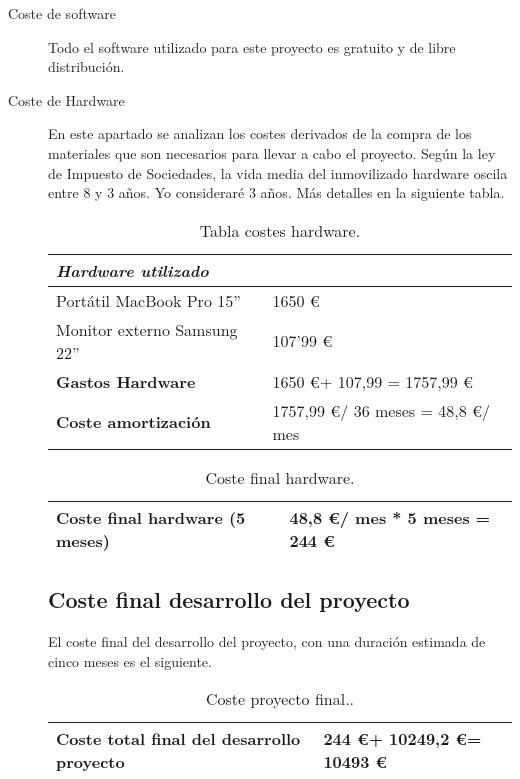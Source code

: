 \begin{description}
	\item[Coste de software] Todo el software utilizado para este proyecto es gratuito y de libre distribución. 
	
	\item[Coste de Hardware] En este apartado se analizan los costes derivados de la compra de los materiales que son necesarios para llevar a cabo el proyecto. Según la ley de Impuesto de Sociedades, la vida media del inmovilizado  hardware oscila entre 8 y 3 a\~nos. Yo consideraré 3 años. Más detalles en la siguiente tabla.  
	
\begin{table}[htbp]
\begin{center}
\begin{tabular}{|l|l|}
\hline
 \emph{Hardware utilizado}&  \\
\hline \hline
 Portátil MacBook Pro 15'' & 1650 \euro  \\ \hline
Monitor externo Samsung 22'' &    107'99 \euro\\ \hline
\textbf{Gastos Hardware}  &   1650 \euro + 107,99  =  1757,99 \euro \\ \hline
\textbf{Coste amortización}  &  1757,99 \euro  / 36 meses = 48,8 \euro / mes  \\ \hline
\end{tabular}
\caption{Tabla costes hardware.}
\label{tabla:hardware}
\end{center}
\end{table}

\begin{table}[htbp]
\begin{center}
\begin{tabular}{|l|l|}
\hline
\textbf{Coste final hardware} (5 meses)  &  48,8 \euro / mes  *  5 meses = 244 \euro   \\ \hline
\end{tabular}
\caption{Coste final hardware.}
\label{tabla:costefinalhardware}
\end{center}
\end{table}


\subsection{Coste final desarrollo del proyecto}\label{coste-final}

El coste final del desarrollo del proyecto, con una duración estimada de cinco meses es el siguiente.  

\begin{table}[htb]
\begin{center}
\begin{tabular}{|l|l|}
\hline
\textbf{Coste total final del desarrollo proyecto}  &  244 \euro +  10249,2 \euro = 10493 \euro   \\ \hline
\end{tabular}
\caption{Coste proyecto final..}
\label{tabla:costefinal}
\end{center}
\end{table}

\end{description}

